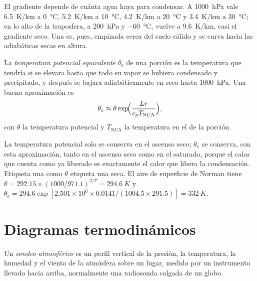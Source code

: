 El gradiente depende de cuánta agua haya para condensar. A \qty{1000}{hPa} vale
\qty{6.5}{K/km} a \qty{0}{\celsius}, \qty{5.2}{K/km} a \qty{10}{\celsius}, \qty{4.2}{K/km} a
\qty{20}{\celsius} y \qty{3.4}{K/km} a \qty{30}{\celsius}; en lo alto de la troposfera, a
\qty{200}{hPa} y \qty{-60}{\celsius}, vuelve a \qty{9.6}{K/km}, casi el gradiente seco. Una
 es, pues, empinada cerca del suelo cálido y se curva hacia las adiabáticas secas en altura.

\begin{definition}\label{def:b2:atmospheric-thermodynamics:theta-e}
La \emph{temperatura potencial equivalente} $\theta_e$ de
una porción es la temperatura que tendría si se elevara hasta que todo su vapor se hubiera condensado
y precipitado, y después se bajara adiabáticamente en seco hasta \qty{1000}{hPa}. Una buena aproximación es
\[
  \theta_e \approx \theta \exp\!\Bigl(\frac{L r}{c_p T_{\text{NCA}}}\Bigr),
\]
con $\theta$ la temperatura potencial y $T_{\text{NCA}}$ la temperatura en el  de la porción.
\end{definition}

La temperatura potencial solo se conserva en el ascenso seco; $\theta_e$ se conserva, con esta
aproximación, tanto en el ascenso seco como en el saturado, porque el calor que cuenta como ya liberado
es exactamente el calor que libera la condensación. Etiqueta una  como $\theta$ etiqueta una seca.
El aire de superficie de Norman tiene $\theta = 292.15 \times (1000/971.1)^{2/7} = \qty{294.6}{K}$ y
$\theta_e = 294.6 \exp[2.501 \times 10^6 \times 0.0141/(1004.5 \times 291.5)] = \qty{332}{K}$.

\section{Diagramas termodinámicos}\label{sec:b2:atmospheric-thermodynamics:diagrams}

\begin{definition}\label{def:b2:atmospheric-thermodynamics:sounding}
Un \emph{sondeo atmosférico} es un perfil vertical de la
presión, la temperatura, la humedad y el viento de la atmósfera sobre un lugar, medido por un
instrumento llevado hacia arriba, normalmente una radiosonda colgada de un globo.
\end{definition}

